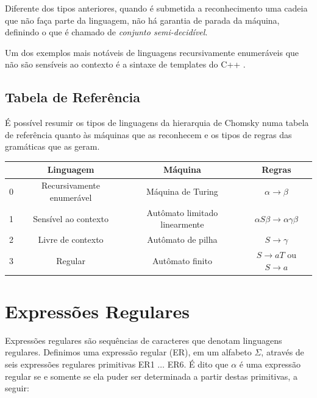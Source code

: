 \documentclass[a4paper,12pt,oneside,onecolumn]{uerj}
\begin{document}
Diferente dos tipos anteriores, quando é submetida a reconhecimento uma cadeia que não faça parte da linguagem, não há garantia de parada da máquina, definindo o que é chamado de \emph{conjunto semi-decidível}.

Um dos exemplos mais notáveis de linguagens recursivamente enumeráveis que não são sensíveis ao contexto é a sintaxe de templates do C++ \cite{bib:Veldhuizen03}.

\subsection{Tabela de Referência}

É possível resumir os tipos de linguagens da hierarquia de Chomsky numa tabela de referência quanto às máquinas que as reconhecem e os tipos de regras das gramáticas que as geram.

\begin{center}
	\begin{tabular}{ c | c | c | c }
		 & {\bf Linguagem} & {\bf Máquina} & {\bf Regras} \\
		\hline 
		0 & Recursivamente enumerável & Máquina de Turing 			 & 
			$\alpha \rightarrow \beta$ \\ 
		1 & Sensível ao contexto 		& Autômato limitado linearmente & 
			$\alpha S\beta\rightarrow \alpha\gamma\beta$\\ 
		2 & Livre de contexto 			& Autômato de pilha 			 & 
			$S \rightarrow \gamma$\\ 
		3 & Regular 					& Autômato finito 				 &
			$S \rightarrow aT$ ou $S \rightarrow a$\\ 
	\end{tabular}
\end{center}

\section{Expressões Regulares}

Expressões regulares são sequências de caracteres que denotam linguagens regulares. Definimos uma expressão regular (ER), em um alfabeto $\Sigma$, através de seis expressões regulares primitivas ER1 $\ldots$ ER6. É dito que $\alpha$ é uma expressão regular se e somente se ela puder ser determinada a partir destas primitivas, a seguir:
\end{document}
